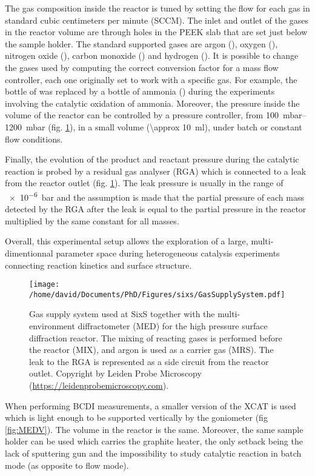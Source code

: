 The gas composition inside the reactor is tuned by setting the flow for each gas in standard cubic centimeters per minute (SCCM).
The inlet and outlet of the gases in the reactor volume are through holes in the PEEK slab that are set just below the sample holder.
The standard supported gases are argon (\argon), oxygen (\dioxygen), nitrogen oxide (\nitricoxide), carbon monoxide () and hydrogen ().
It is possible to change the gases used by computing the correct conversion factor for a mass flow controller, each one originally set to work with a specific gas.
For example, the bottle of  was replaced by a bottle of ammonia (\ammonia) during the experiments involving the catalytic oxidation of ammonia.
Moreover, the pressure inside the volume of the reactor can be controlled by a pressure controller, from \qtyrange{100}{1200}{\milli\bar} (fig. \ref{fig:GasSupplySystem}), in a small volume (\qty{\approx 10}{\ml}), under batch or constant flow conditions.

Finally, the evolution of the product and reactant pressure during the catalytic reaction is probed by a residual gas analyser (RGA) which is connected to a leak from the reactor outlet (fig. \ref{fig:GasSupplySystem}).
The leak pressure is usually in the range of \qty{e-6}{\bar} and the assumption is made that the partial pressure of each mass detected by the RGA after the leak is equal to the partial pressure in the reactor multiplied by the same constant for all masses.

Overall, this experimental setup allows the exploration of a large, multi-dimentionnal parameter space during heterogeneous catalysis experiments connecting reaction kinetics and surface structure.

\begin{figure}[!htb]
    \centering
    \texttt{[image: /home/david/Documents/PhD/Figures/sixs/GasSupplySystem.pdf]}
    \caption{
    	Gas supply system used at SixS together with the multi-environment diffractometer (MED) for the high pressure surface diffraction reactor.
    	The mixing of reacting gases is performed before the reactor (MIX), and argon is used as a carrier gas (MRS).
    	The leak to the RGA is represented as a side circuit from the reactor outlet.
    	Copyright by Leiden Probe Microscopy (\url{https://leidenprobemicroscopy.com}).
    }
    \label{fig:GasSupplySystem}
\end{figure}

When performing BCDI measurements, a smaller version of the XCAT is used which is light enough to be supported vertically by the goniometer (fig \ref{fig:MEDV}).
The volume in the reactor is the same.
Moreover, the same sample holder can be used which carries the graphite heater, the only setback being the lack of sputtering gun and the impossibility to study catalytic reaction in batch mode (as opposite to flow mode).

